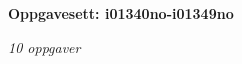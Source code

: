 \centerline{\bf Oppgavesett: i01340no-i01349no}
\vskip 10pt
\centerline{\it 10 oppgaver}\vskip 10pt
\vskip 10pt
